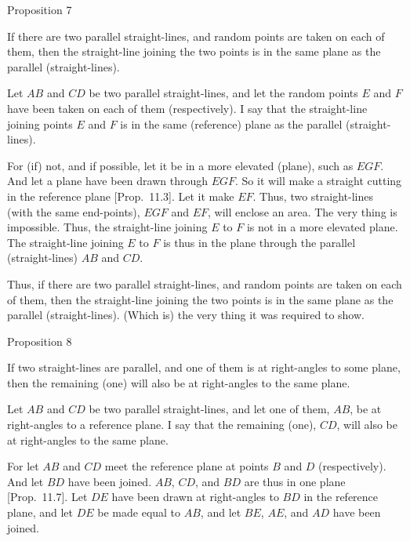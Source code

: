 \begin{center}
{\large Proposition 7}
\end{center}

If there are two parallel straight-lines, and
random points are taken on each of them, then the straight-line joining the
two points is in the same plane as the parallel (straight-lines).

\epsfysize=1.5in
\centerline{}

Let $AB$ and $CD$ be two parallel straight-lines, and let the random
points $E$ and $F$ have been taken on each of them (respectively). I say that the straight-line joining points $E$ and $F$ is in the same (reference) plane as the parallel
(straight-lines).

For (if)  not, and if possible, let it be in a more elevated (plane), such as
$EGF$. And let a plane have been drawn through $EGF$. So it will
make a straight cutting in the reference plane [Prop.~11.3]. Let it make $EF$. Thus, two straight-lines (with the
same end-points), $EGF$ and $EF$,  will enclose an area. The very thing is
impossible. Thus, the straight-line joining $E$ to $F$ is not in a more
elevated plane. The straight-line joining $E$ to $F$ is thus in the plane
through the parallel (straight-lines) $AB$ and $CD$.

Thus, if there are two parallel straight-lines, and
random points are taken on each of them, then the straight-line joining the
two points is in the same plane as the parallel (straight-lines). (Which is)
the very thing it was required to show.


\begin{center}
{\large Proposition 8}
\end{center}

If two  straight-lines are parallel, and one of them is at right-angles to some plane, then the remaining (one) will also
be at right-angles to the same plane.

\epsfysize=2.5in
\centerline{}

Let $AB$ and $CD$ be two parallel straight-lines, and let one of them, $AB$,
be at right-angles to a reference plane. I say that the remaining (one), $CD$,
will also be at right-angles to the same plane.

For let $AB$ and $CD$ meet the reference plane at points $B$ and $D$
(respectively). And let $BD$ have been joined. $AB$, $CD$, and $BD$
are thus in one plane [Prop.~11.7]. 
Let $DE$ have been drawn at right-angles to $BD$ in the reference plane, and
let $DE$ be made equal to $AB$, and let $BE$, $AE$, and $AD$ have been
joined.

